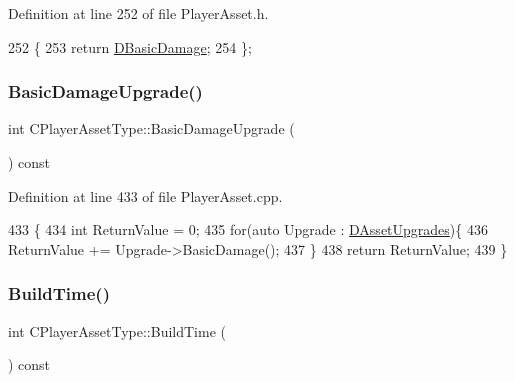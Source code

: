 Definition at line 252 of file Player\+Asset.\+h.


\begin{DoxyCode}
252                                \{
253             \textcolor{keywordflow}{return} \hyperlink{classCPlayerAssetType_ade46bb31e24e01ba4b523bdf67472d59}{DBasicDamage};  
254         \};
\end{DoxyCode}
\hypertarget{classCPlayerAssetType_a0192995a2cfc976d67753fc105e83082}{}\label{classCPlayerAssetType_a0192995a2cfc976d67753fc105e83082} 
\subsubsection{\texorpdfstring{Basic\+Damage\+Upgrade()}{BasicDamageUpgrade()}}
{\footnotesize\ttfamily int C\+Player\+Asset\+Type\+::\+Basic\+Damage\+Upgrade (\begin{DoxyParamCaption}{ }\end{DoxyParamCaption}) const}



Definition at line 433 of file Player\+Asset.\+cpp.


\begin{DoxyCode}
433                                               \{
434     \textcolor{keywordtype}{int} ReturnValue = 0;
435     \textcolor{keywordflow}{for}(\textcolor{keyword}{auto} Upgrade : \hyperlink{classCPlayerAssetType_aeb8d5c3ea81ea56248d02a5e24d48001}{DAssetUpgrades})\{
436         ReturnValue += Upgrade->BasicDamage();
437     \}
438     \textcolor{keywordflow}{return} ReturnValue;
439 \}
\end{DoxyCode}
\hypertarget{classCPlayerAssetType_a810984e76d036da68dec6f03ebf6c1a6}{}\label{classCPlayerAssetType_a810984e76d036da68dec6f03ebf6c1a6} 
\subsubsection{\texorpdfstring{Build\+Time()}{BuildTime()}}
{\footnotesize\ttfamily int C\+Player\+Asset\+Type\+::\+Build\+Time (\begin{DoxyParamCaption}{ }\end{DoxyParamCaption}) const\hspace{0.3cm}{\ttfamily [inline]}}



